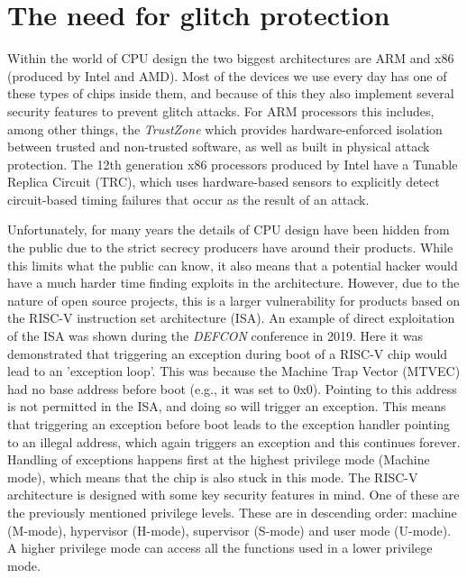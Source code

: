 
\section{The need for glitch protection}
\label{sec:need}

Within the world of CPU design the two biggest architectures are ARM and x86 (produced by Intel and AMD). Most of the devices we use every day has one of these types of chips inside them, and because of this they also implement several security features to prevent glitch attacks. For ARM processors this includes, among other things, the \textit{TrustZone} which provides hardware-enforced isolation between trusted and non-trusted software, as well as built in physical attack protection\cite{arm}. The 12th generation x86 processors produced by Intel have a Tunable Replica Circuit (TRC), which uses hardware-based sensors to explicitly detect circuit-based timing failures that occur as the result of an attack\cite{intel}.  

Unfortunately, for many years the details of CPU design have been hidden from the public due to the strict secrecy producers have around their products\cite{riscv_wiki}. While this limits what the public can know, it also means that a potential hacker would have a much harder time finding exploits in the architecture. However, due to the nature of open source projects, this is a larger vulnerability for products based on the RISC-V instruction set architecture (ISA). An example of direct exploitation of the ISA was shown during the \textit{DEFCON} conference in 2019\cite{mtvec_corruption}. Here it was demonstrated that triggering an exception during boot of a RISC-V chip would lead to an 'exception loop'. This was because the Machine Trap Vector (MTVEC) had no base address before boot (e.g., it was set to 0x0). Pointing to this address is not permitted in the ISA, and doing so will trigger an exception. This means that triggering an exception before boot leads to the exception handler pointing to an illegal address, which again triggers an exception and this continues forever. Handling of exceptions happens first at the highest privilege mode (Machine mode), which means that the chip is also stuck in this mode. The RISC-V architecture is designed with some key security features in mind. One of these are the previously mentioned privilege levels. These are in descending order: machine (M-mode), hypervisor (H-mode), supervisor (S-mode) and user mode (U-mode). A higher privilege mode can access all the functions used in a lower privilege mode\cite{source2}.


